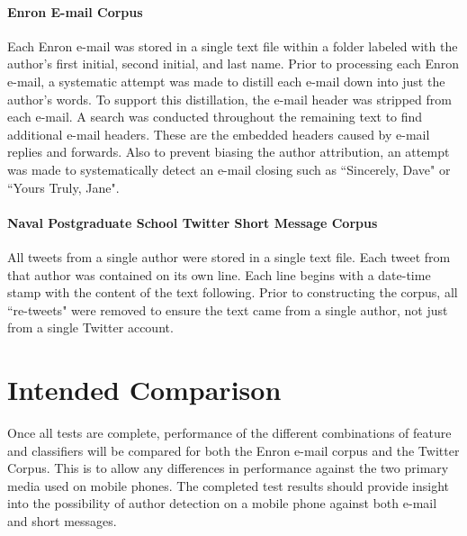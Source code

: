 	\paragraph{Enron E-mail Corpus} Each Enron e-mail was stored in a single text file within a folder labeled with the author's first initial, second initial, and last name.  Prior to processing each Enron e-mail, a systematic attempt was made to distill each e-mail down into just the author's words.  To support this distillation, the e-mail header was stripped from each e-mail.  A search was conducted throughout the remaining text to find additional e-mail headers.  These are the embedded headers caused by e-mail replies and forwards.  Also to prevent biasing the author attribution, an attempt was made to systematically detect an e-mail closing such as ``Sincerely, Dave" or ``Yours Truly, Jane".
	\paragraph{Naval Postgraduate School Twitter Short Message Corpus} All tweets from a single author were stored in a single text file.  Each tweet from that author was contained on its own line.  Each line begins with a date-time stamp with the content of the text following.  Prior to constructing the corpus, all ``re-tweets" were removed to ensure the text came from a single author, not just from a single Twitter account.
	
\section{Intended Comparison}  Once all tests are complete, performance of the different combinations of feature and classifiers will be compared for both the Enron e-mail corpus and the Twitter Corpus.  This is to allow any differences in performance against the two primary media used on mobile phones.  The completed test results should provide insight into the possibility of author detection on a mobile phone against both e-mail and short messages.




